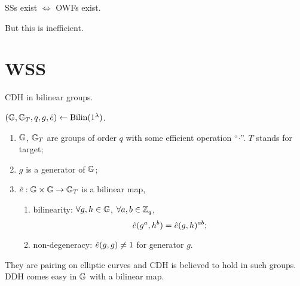 \begin{theorem}
	\acp{SS} exist $\iff$ \acp{OWF} exist.
\end{theorem}
But this is inefficient.

\section{\acl{WSS}}

\ac{CDH} in bilinear groups.

\begin{definition}
	$\left( \mathbb{G}, \mathbb{G}_{T}, q, g, \hat{e} \right) \leftarrow \mathrm{Bilin}(1^{\lambda})$.
	\begin{enumerate}
		\item $\mathbb{G}$, $\mathbb{G}_{T}$ are groups of order $q$ with some efficient operation ``$\cdot$''.
			$T$ stands for target;
		\item $g$ is a generator of $\mathbb{G}$;
		\item $\hat{e} : \mathbb{G} \times \mathbb{G} \to \mathbb{G}_{T}$ is a bilinear map, \ie
			\begin{enumerate}
				\item bilinearity: $\forall g, h \in \mathbb{G}$, $\forall a, b \in \mathbb{Z}_q$,
					\begin{equation*}
						\hat{e}(g^a, h^b) = \hat{e}(g, h)^{ab};
					\end{equation*}
				\item non-degeneracy: $\hat{e}(g,g) \neq 1$ for generator $g$. \qedhere
			\end{enumerate}
	\end{enumerate}
\end{definition}

\begin{observation}
	They are pairing on elliptic curves and \ac{CDH} is believed to hold in such groups.
	\ac{DDH} comes easy in $\mathbb{G}$ with a bilinear map.
\end{observation}


